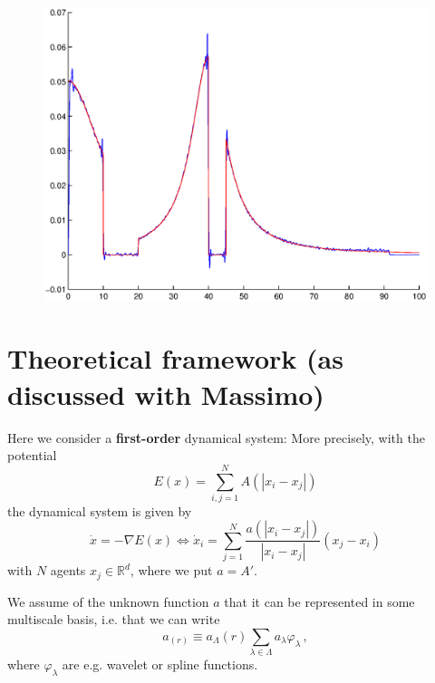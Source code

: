 \documentclass[A4paper,11pt]{article}
\theoremstyle{definition}
\newcommand{\R}{\mathbb{R}}
\begin{document}
\begin{figure}[H]
\begin{minipage}{.33\textwidth}
  \vspace{0.2cm}
  \includegraphics[scale=0.25]{pictures/Example9/Fig7.eps}
  \label{fig:9_7}
\end{minipage}%
\caption{}
\label{fig:9}
\end{figure}


\newpage

\section{Theoretical framework (as discussed with Massimo)}

Here we consider a {\bf first-order} dynamical system: More precisely, with the potential
\[
	E(x)=\sum_{i,j=1}^N A(|x_i-x_j|)
\]
the dynamical system is given by
\[
	\dot x=-\nabla E(x)\iff \dot x_i=\sum_{j=1}^N\frac{a(|x_i-x_j|)}{|x_i-x_j|}(x_j-x_i)
\]
with $N$ agents $x_j\in\R^d$, where we put $a=A'$.

We assume of the unknown function $a$ that it can be represented in some multiscale basis, i.e. that we can write
\[
	a_(r)\equiv a_\Lambda(r)\sum_{\lambda\in\Lambda}a_\lambda\varphi_\lambda\,,
\]
where $\varphi_\lambda$ are e.g. wavelet or spline functions.
\end{document}
